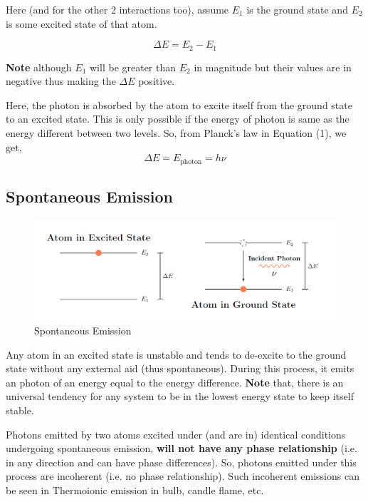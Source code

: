 \documentclass[12pt]{article}
\begin{document}
Here (and for the other 2 interactions too), assume $E_{1}$ is the ground state and $E_{2}$ is some excited state of that atom.

\begin{equation}
    \Delta E = E_{2} - E_{1}
\end{equation}

\textbf{Note} although $E_{1}$ will be greater than $E_{2}$ in magnitude but their values are in negative thus making the $\Delta E$ positive. \vspace{.2cm}

Here, the photon is absorbed by the atom to excite itself from the ground state to an excited state. This is only possible if the energy of photon is same as the energy different between two levels. So, from Planck's law in Equation (1), we get,
\begin{equation}
    \Delta E = E_{\text{photon}} = h\nu
\end{equation}

\subsection{Spontaneous Emission}

\begin{figure}[H]
    \centering
    \includegraphics[scale=0.8]{./img/04_spontaneous_emission.png}
    \caption{Spontaneous Emission}
\end{figure}

Any atom in an excited state is unstable and tends to de-excite to the ground state without any external aid (thus spontaneous). During this process, it emits an photon of an energy equal to the energy difference. \textbf{Note} that, there is an universal tendency for any system to be in the lowest energy state to keep itself stable.

Photons emitted by two atoms excited under (and are in) identical conditions undergoing spontaneous emission, \textbf{will not have any phase relationship} (i.e. in any direction and can have phase differences). So, photons emitted under this process are incoherent (i.e. no phase relationship). Such incoherent emissions can be seen in Thermoionic emission in bulb, candle flame, etc.
\end{document}
